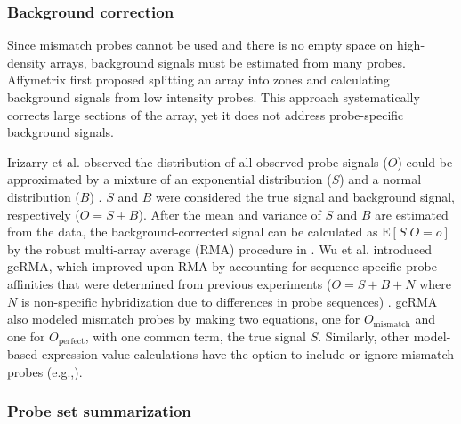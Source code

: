 \subsubsection{Background correction}

Since mismatch probes cannot be used and there is no 
empty space on high-density arrays, 
background signals must be estimated from many
probes. Affymetrix first proposed splitting an array
into zones and calculating background signals from low
intensity probes. This approach systematically corrects large
sections of the array,
yet it does not address probe-specific background signals.

Irizarry et al. observed the distribution
of all observed probe signals ($O$) could be approximated by
a mixture of an exponential distribution ($S$) and a
normal distribution ($B$) \cite{Irizarry:2003ge}.
$S$ and $B$ were considered the true signal and background signal, respectively ($O=S+B$).
After the mean and variance of $S$ and $B$ are estimated from the data, 
the background-corrected signal can be calculated 
as $\text{E}[S|O=o]$ by the robust multi-array average (RMA) procedure in
\cite{Irizarry:2003ge}. 
Wu et al. introduced gcRMA, which improved upon RMA by 
accounting for sequence-specific probe
affinities that were determined from previous experiments
($O=S+B+N$ where $N$ is non-specific hybridization due to
differences in probe sequences) \cite{Wu:2004wh}. gcRMA
also modeled mismatch probes by making two equations, one for 
$O_{\text{mismatch}}$ and one for $O_{\text{perfect}}$, with one common 
term, the true signal $S$. 
Similarly, other model-based expression value calculations
have the option to include or ignore
mismatch probes (e.g.,\cite{Li:2001jv,Milo:2003tt}).

\subsubsection{Probe set summarization}


